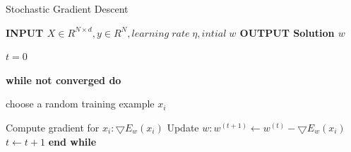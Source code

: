 \documentclass{sigplanconf}
\newlength\myindent
\newcommand\bindent{
  \begingroup
  \setlength{\itemindent}{\myindent}
  \addtolength{\algorithmicindent}{\myindent}
}
\newcommand\eindent{\endgroup}
\begin{document}
\begin{algorithm}
\caption{Stochastic Gradient Descent}
\begin{algorithmic} 

\STATE \bf{INPUT} \begin{math} X \in {R}^{N \times  d}, y \in R^N, learning\;  rate\;  \eta, intial\; w \end{math} 
\STATE \bf{OUTPUT} \textnormal{Solution} \begin{math}  w \end{math} 

	\STATE \textnormal{\begin{math} t = 0\end{math} }

	\STATE \bf{while} \textnormal{not converged} \bf{do}
    	\bindent
	 \STATE \textnormal{\indent choose a random training example \begin{math}x_i\end{math}}

	 \STATE \textnormal{\indent Compute gradient for \begin{math}x_i: \bigtriangledown{E_w(x_i)}\end{math}}
	 \STATE \textnormal{\indent Update \begin{math}w: w^{(t+1)} \gets w^{(t)} - \bigtriangledown{E_w(x_i)}\end{math}}
	 \STATE \textnormal{\indent \begin{math}t \gets t + 1\end{math}}
	    \eindent
	\STATE \bf{end while}

\end{algorithmic}
\end{algorithm}
\end{document}
